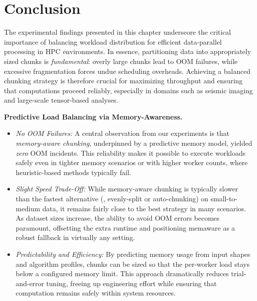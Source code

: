 \section{Conclusion}
\label{sec:idp-conclusion}

The experimental findings presented in this chapter underscore the critical importance of balancing workload distribution for efficient data-parallel processing in \ac{HPC} environments.
In essence, partitioning data into appropriately sized chunks is \emph{fundamental}: overly large chunks lead to \ac{OOM} failures, while excessive fragmentation forces undue scheduling overheads.
Achieving a balanced chunking strategy is therefore crucial for maximizing throughput and ensuring that computations proceed reliably, especially in domains such as seismic imaging and large-scale tensor-based analyses.

\vspace{6pt}
\noindent
\textbf{Predictive Load Balancing via Memory-Awareness.}
\begin{itemize}
    \item \emph{No \ac{OOM} Failures:} A central observation from our experiments is that \emph{memory-aware chunking}, underpinned by a predictive memory model, yielded \emph{zero} \ac{OOM} incidents. This reliability makes it possible to execute workloads safely even in tighter memory scenarios or with higher worker counts, where heuristic-based methods typically fail.
    \item \emph{Slight Speed Trade-Off:} While memory-aware chunking is typically slower than the fastest alternative (\eg, evenly-split or auto-chunking) on small-to-medium data, it remains fairly close to the best strategy in many scenarios. As dataset sizes increase, the ability to avoid \ac{OOM} errors becomes paramount, offsetting the extra runtime and positioning memaware as a robust fallback in virtually any setting.
    \item \emph{Predictability and Efficiency:} By predicting memory usage from input shapes and algorithm profiles, chunks can be sized so that the per-worker load stays below a configured memory limit. This approach dramatically reduces trial-and-error tuning, freeing up engineering effort while ensuring that computation remains safely within system resources.
\end{itemize}

